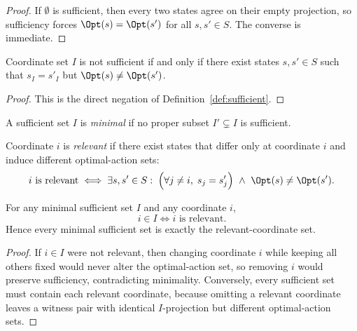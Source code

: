 
\begin{proof}
If $\emptyset$ is sufficient, then every two states agree on their empty projection, so sufficiency forces $\Opt(s)=\Opt(s')$ for all $s,s' \in S$. The converse is immediate.
\end{proof}

\begin{proposition}\label{prop:insufficiency-counterexample}
Coordinate set $I$ is not sufficient if and only if there exist states $s,s' \in S$ such that $s_I=s'_I$ but $\Opt(s)\neq\Opt(s')$.
\end{proposition}


\begin{proof}
This is the direct negation of Definition~\ref{def:sufficient}.
\end{proof}

\begin{definition}\label{def:minimal-sufficient}
A sufficient set $I$ is \emph{minimal} if no proper subset $I' \subsetneq I$ is sufficient.
\end{definition}

\begin{definition}\label{def:relevant}
Coordinate $i$ is \emph{relevant} if there exist states that differ only at coordinate $i$ and induce different optimal-action sets:
\[
i \text{ is relevant}
\iff
\exists s,s' \in S:\;
\Big(\forall j \neq i,\; s_j=s'_j\Big)
\ \wedge\
\Opt(s)\neq\Opt(s').
\]
\end{definition}

\begin{proposition}\label{prop:minimal-relevant-equiv}
For any minimal sufficient set $I$ and any coordinate $i$,
\[
i \in I \iff i \text{ is relevant}.
\]
Hence every minimal sufficient set is exactly the relevant-coordinate set.
\end{proposition}


\begin{proof}
If $i \in I$ were not relevant, then changing coordinate $i$ while keeping all others fixed would never alter the optimal-action set, so removing $i$ would preserve sufficiency, contradicting minimality. Conversely, every sufficient set must contain each relevant coordinate, because omitting a relevant coordinate leaves a witness pair with identical $I$-projection but different optimal-action sets.
\end{proof}

